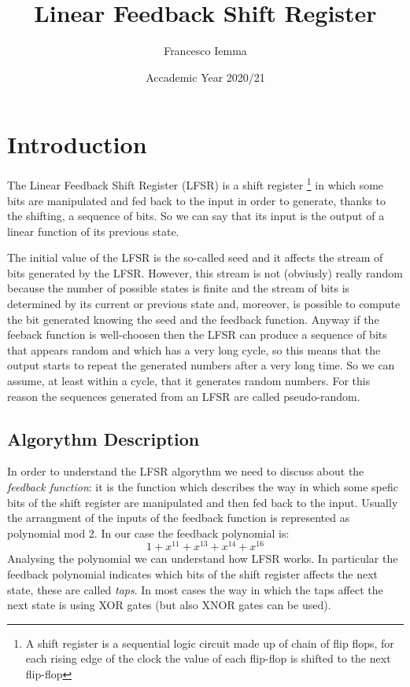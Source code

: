 \documentclass[a4paper]{report}
\begin{document}
\title{\Huge{Linear Feedback Shift Register}}
\author{\Large{Francesco Iemma}}
\date{Accademic Year 2020/21}
\maketitle
\tableofcontents

\chapter{Introduction}
The Linear Feedback Shift Register (LFSR) is a shift register \footnote{A shift register is a sequential logic circuit made up of  chain of flip flops, for each rising edge of the clock the value of each flip-flop is shifted to the next flip-flop} in which some bits are manipulated and fed back to the input in order to generate, thanks to the shifting, a sequence of bits. So we can say that its input is the output of a linear function of its previous state.

\noindent The initial value of the LFSR is the so-called seed and it affects the stream of bits generated by the LFSR. However, this stream is not (obviusly) really random because the number of possible states is finite and the stream of bits is determined by its current or previous state and, moreover, is possible to compute the bit generated knowing the seed and the feedback function.
\noindent Anyway if the feeback function is well-choosen then the LFSR can produce a sequence of bits that appears random and which has a very long cycle, so this means that the output starts to repeat the generated numbers after a very long time. So we can assume, at least within a cycle, that it generates random numbers. For this reason the sequences generated from an LFSR are called pseudo-random.

\section{Algorythm Description}
In order to understand the LFSR algorythm we need to discuss about the \emph{feedback function}: it is the function which describes the way in which some spefic bits of the shift register are manipulated and then fed back to the input. Usually the arrangment of the inputs of the feedback function is represented as polynomial mod 2. In our case the feedback polynomial is:
\[1+x^{11}+x^{13}+x^{14}+x^{16}\]
Analysing the polynomial we can understand how LFSR works. In particular the feedback polynomial indicates which bits of the shift register affects the next state, these are called \emph{taps}.
In most cases the way in which the taps affect the next state is using XOR gates (but also XNOR gates can be used).
\end{document}
